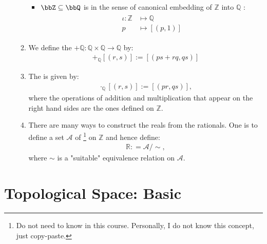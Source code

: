 \documentclass{article}
\begin{document}
\begin{enumerate}
\begin{enumerate}
\begin{itemize}
    \item $\bbZ\subseteq\bbQ$ is in the sense of canonical embedding of $\mathbb{Z}$ into $\mathbb{Q}$ :
\begin{align*}
\begin{aligned}
\iota: \mathbb{Z} & \mapsto \mathbb{Q} \\
p & \mapsto[(p, 1)]
\end{aligned}
\end{align*}
\end{itemize}
\item We define the  $+\mathbb{Q:} \mathbb{Q} \times \mathbb{Q} \rightarrow \mathbb{Q}$ by:
\begin{align*}
[(p, q)]+_{\mathbb{Q}}[(r, s)]:=[(p s+r q, q s)]
\end{align*}
\item The  is given by:
\begin{align*}
[(p, q)] \cdot_\mathbb{Q}[(r, s)]:=[(p r, q s)],
\end{align*}
where the operations of addition and multiplication that appear on the right hand sides are the ones defined on $\mathbb{Z}$. 

\item  There are many ways to construct the reals from the rationals. One is to define a set $\mathscr{A}$ of \footnote{Do not need to know in this course. Personally, I do not know this concept, just copy-paste.} on $\mathbb{Z}$ and hence define:
\begin{align*}
\mathbb{R:}=\mathscr{A} / \sim,
\end{align*}
where $\sim$ is a "suitable" equivalence relation on $\mathscr{A}$.
\end{enumerate}

\end{enumerate}

\section{Topological Space: Basic}

\end{document}
